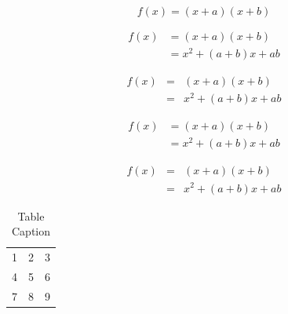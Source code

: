 \documentclass[authoryear,preprint,12pt,3p]{elsarticle}
\begin{document}
\begin{equation*}
f(x) = (x+a)(x+b)
\end{equation*}

\begin{align}
 f(x) &= (x+a)(x+b) \\
      &= x^2 + (a+b)x + ab
\end{align}

\begin{eqnarray}
 f(x) &=& (x+a)(x+b) \nonumber\\ %
      &=& x^2 + (a+b)x + ab
\end{eqnarray}

\begin{align*}
 f(x) &= (x+a)(x+b) \\
      &= x^2 + (a+b)x + ab
\end{align*}

\begin{eqnarray*}
 f(x)&=& (x+a)(x+b) \\
     &=& x^2 + (a+b)x + ab
\end{eqnarray*}


\begin{table}[t]%
\centering%
\begin{tabular}{l c r}%
  1 & 2 & 3 \\ %
  4 & 5 & 6 \\
  7 & 8 & 9 \\
\end{tabular}
\caption{Table Caption}\label{fig1}
\end{table}
\end{document}
